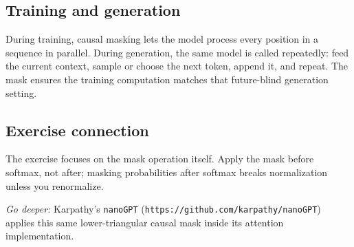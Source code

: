 \subsection*{Training and generation}
During training, causal masking lets the model process every position in a
sequence in parallel. During generation, the same model is called repeatedly:
feed the current context, sample or choose the next token, append it, and repeat.
The mask ensures the training computation matches that future-blind generation
setting.

\subsection*{Exercise connection}
The exercise focuses on the mask operation itself. Apply the mask before
softmax, not after; masking probabilities after softmax breaks normalization
unless you renormalize.

\medskip
\noindent\textit{Go deeper:} Karpathy's \texttt{nanoGPT}
(\texttt{https://github.com/karpathy/nanoGPT}) applies this same
lower-triangular causal mask inside its attention implementation.
